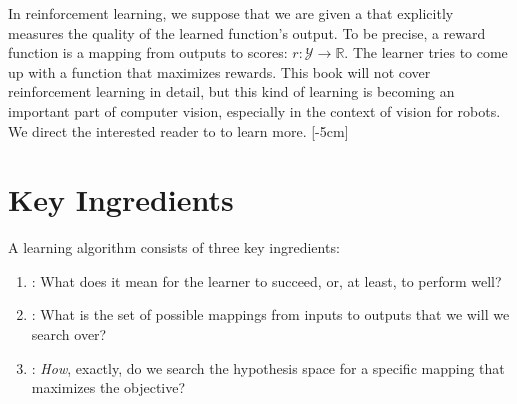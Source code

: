 In reinforcement learning, we suppose that we are given a 
 that explicitly measures the quality of the learned function's output. To be precise, a reward function is a mapping from outputs to scores: $r: \mathcal{Y} \rightarrow \mathbb{R}$. The learner tries to come up with a function that maximizes rewards. This book will not cover reinforcement learning in detail, but this kind of learning is becoming an important part of computer vision, especially in the context of vision for robots. We direct the interested reader to \cite{sutton2018reinforcement} to learn more.%
[-5cm]


\section{Key Ingredients}
\label{sec:intro_to_learning:key_ingredients}

A learning algorithm consists of three key ingredients:
\begin{enumerate}
    \item {}: What does it mean for the learner to succeed, or, at least, to perform well? 
    \item {}: What is the set of possible mappings from inputs to outputs that we will we search over?
    \item {}: \emph{How}, exactly, do we search the hypothesis space for a specific mapping that maximizes the objective?
\end{enumerate}

